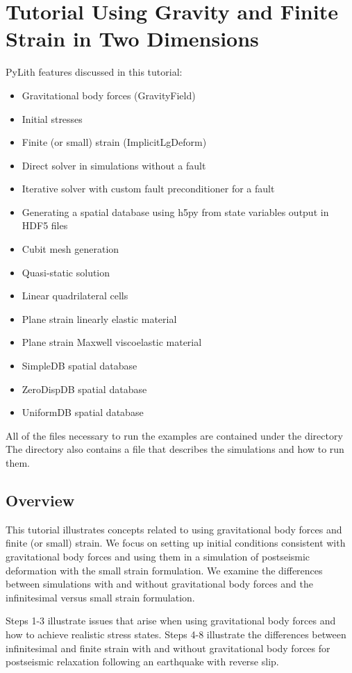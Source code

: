 \section{Tutorial Using Gravity and Finite Strain in Two Dimensions}
\label{sec:example:grav2d}

PyLith features discussed in this tutorial:
\begin{itemize}
\item Gravitational body forces (GravityField)
\item Initial stresses
\item Finite (or small) strain (ImplicitLgDeform)
\item Direct solver in simulations without a fault
\item Iterative solver with custom fault preconditioner for a fault
\item Generating a spatial database using h5py from state variables output
in HDF5 files
\item Cubit mesh generation
\item Quasi-static solution
\item Linear quadrilateral cells
\item Plane strain linearly elastic material
\item Plane strain Maxwell viscoelastic material
\item SimpleDB spatial database
\item ZeroDispDB spatial database
\item UniformDB spatial database
\end{itemize}
All of the files necessary to run the examples are contained under
the directory The directory also contains
a  file that describes the simulations and how to run
them.


\subsection{Overview}

This tutorial illustrates concepts related to using gravitational
body forces and finite (or small) strain. We focus on setting up initial
conditions consistent with gravitational body forces and using them
in a simulation of postseismic deformation with the small strain formulation.
We examine the differences between simulations with and without gravitational
body forces and the infinitesimal versus small strain formulation.

Steps 1-3 illustrate issues that arise when using gravitational body
forces and how to achieve realistic stress states. Steps 4-8 illustrate
the differences between infinitesimal and finite strain with and without
gravitational body forces for postseismic relaxation following an
earthquake with reverse slip.


